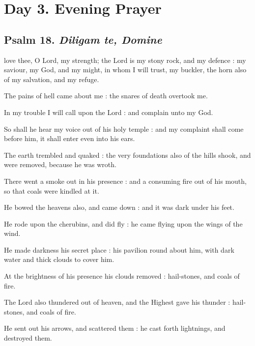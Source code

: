 \clearpage
\section*{Day 3. Evening Prayer}

\subsection{Psalm 18. \textit{Diligam te, Domine}}

 love thee, O Lord, my strength; the Lord is my stony rock, and my defence : my saviour, my God, and my might, in whom I will trust, my buckler, the horn also of my salvation, and my refuge.\par
{}
The pains of hell came about me : the snares of death overtook me.\par
{}In my trouble I will call upon the Lord : and complain unto my God.\par
{}So shall he hear my voice out of his holy temple : and my complaint shall come before him, it shall enter even into his ears.\par
{}The earth trembled and quaked : the very foundations also of the hills shook, and were removed, because he was wroth.\par
{}There went a smoke out in his presence : and a consuming fire out of his mouth, so that coals were kindled at it.\par
{}He bowed the heavens also, and came down : and it was dark under his feet.\par
{}He rode upon the cherubins, and did fly : he came flying upon the wings of the wind.\par
{}He made darkness his secret place : his pavilion round about him, with dark water and thick clouds to cover him.\par
{}At the brightness of his presence his clouds removed : hail-stones, and coals of fire.\par
{}The Lord also thundered out of heaven, and the Highest gave his thunder : hail-stones, and coals of fire.\par
{}He sent out his arrows, and scattered them : he cast forth lightnings, and destroyed them.\par
